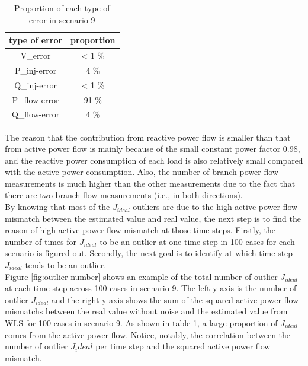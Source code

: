     \begin{table}[!h]
        \centering
        \begin{tabular}{c|c}
            type of error & proportion\\ \hline
            V_{error} &  {< 1 \%}   \\
            P_{inj-error} &  4 \% \\
            Q_{inj-error} & {< 1 \%} \\
            P_{flow-error} & 91 \% \\
            Q_{flow-error} & 4 \% \\
        \end{tabular}
        \caption{Proportion of each type of error in scenario 9}
        \label{tab:pie table}
    \end{table}
 The reason that the contribution from reactive power flow is smaller than that from active power flow is mainly because of the small constant power factor 0.98, and the reactive power consumption of each load is also relatively small compared with the active power consumption. Also, the number of branch power flow measurements is much higher than the other measurements due to the fact that there are two branch flow measurements (i.e., in both directions).
\bigskip
\\By knowing that most of the $J_{ideal}$ outliers are due to the high active power flow mismatch between the estimated value and real value, the next step is to find the reason of high active power flow mismatch at those time steps. Firstly, the number of times for $J_{ideal}$ to be an outlier at one time step in 100 cases for each scenario is figured out. Secondly, the next goal is to identify at which time step $J_{ideal}$ tends to be an outlier. 
\bigskip
\\Figure \ref{fig:outlier number} shows an example of the total number of outlier $J_{ideal}$ at each time step across 100 cases in scenario 9. The left y-axis is the number of outlier $J_{ideal}$ and the right y-axis shows the sum of the squared active power flow mismatchs between the real value without noise and the estimated value from WLS for 100 cases in scenario 9. As shown in table \ref{tab:pie table}, a large proportion of $J_{ideal}$ comes from the active power flow. Notice, notably, the correlation between the number of outlier $J_ideal$ per time step and the squared active power flow mismatch.
